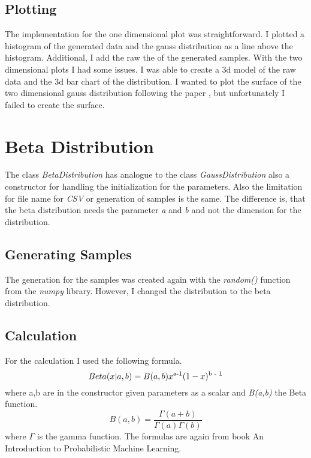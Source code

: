 \documentclass[10pt, a4paper, twocolumn]{article} %
\begin{document}
\subsection{Plotting}
The implementation for the one dimensional plot was straightforward. I plotted a histogram of the generated data and the gauss distribution as a line above the histogram. Additional, I add the raw the of the generated samples. With the two dimensional plots I had some issues. I was able to create a 3d model of the raw data and the 3d bar chart of the distribution. I wanted to plot the surface of the two dimensional gauss distribution following the paper \citep{multiVariateNormalDistribution}, but unfortunately I failed to create the surface. 

\section{Beta Distribution}
The class \textit{BetaDistribution} has analogue to the class \textit{GaussDistribution} also a constructor for handling the initialization for the parameters. Also the limitation for file name for \textit{CSV} or generation of samples is the same. The difference is, that the beta distribution needs the parameter \textit{a} and \textit{b} and not the dimension for the distribution. 

\subsection{Generating Samples}
The generation for the samples was created again with the \textit{random()} function from the \textit{numpy} library. However, I changed the distribution to the beta distribution. 



\subsection{Calculation}
For the calculation I used the following formula. 
\[
Beta(x|a,b) = B(a,b)x\textsuperscript{a-1}(1 - x)\textsuperscript{b - 1}
\]
where a,b are in the constructor given parameters as a scalar and \textit{B(a,b)} the Beta function. 
\[
B(a,b) = \frac{\Gamma(a + b)}{\Gamma(a)\Gamma(b)}
\]
where $\Gamma$ is the gamma function. The formulas are again from book An Introduction to Probabilistic Machine Learning.  
\citep{bookMachineLearning}
\end{document}
